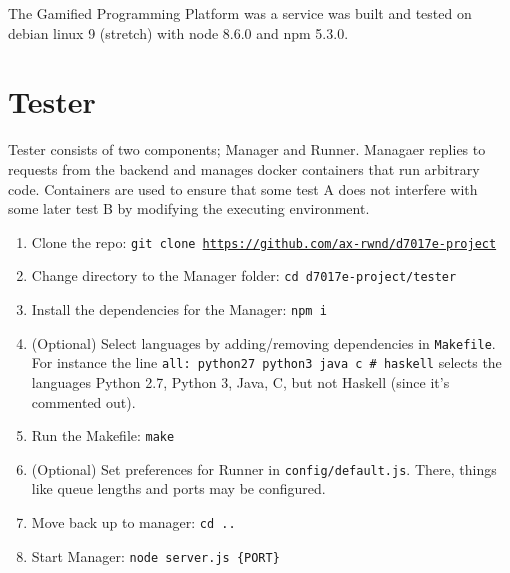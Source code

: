 The Gamified Programming Platform was a service was built and tested on debian linux 9 (stretch) with node 8.6.0 and npm 5.3.0.

\section{Tester}
Tester consists of two components; Manager and Runner. Managaer replies to requests from the backend and manages docker containers that run arbitrary code. Containers are used to ensure that some test A does not interfere with some later test B by modifying the executing environment.\\
\begin{enumerate}
    \item Clone the repo: \texttt{git clone \url{https://github.com/ax-rwnd/d7017e-project}}
    \item Change directory to the Manager folder: \texttt{cd d7017e-project/tester}
    \item Install the dependencies for the Manager: \texttt{npm i}
    \item (Optional) Select languages by adding/removing dependencies in \texttt{Makefile}. For instance the line \texttt{all: python27 python3 java c \# haskell} selects the languages Python 2.7, Python 3, Java, C, but not Haskell (since it's commented out).
    \item Run the Makefile: \texttt{make}
    \item (Optional) Set preferences for Runner in \texttt{config/default.js}. There, things like queue lengths and ports may be configured.
    \item Move back up to manager: \texttt{cd ..}
    \item Start Manager: \texttt{node server.js \{PORT\}}
\end{enumerate}

